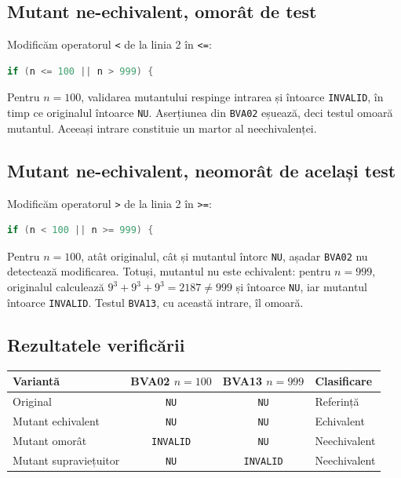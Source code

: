 \documentclass[11pt,a4paper]{article}
\begin{document}
\subsection{Mutant ne-echivalent, omorât de test}
Modificăm operatorul \texttt{<} de la linia 2 în \texttt{<=}:
\begin{lstlisting}[language=Java,firstnumber=2]
if (n <= 100 || n > 999) {
\end{lstlisting}
Pentru $n=100$, validarea mutantului respinge intrarea și întoarce
\texttt{INVALID}, în timp ce originalul întoarce \texttt{NU}.
Aserțiunea din \texttt{BVA02} eșuează, deci testul omoară mutantul.
Aceeași intrare constituie un martor al neechivalenței.

\subsection{Mutant ne-echivalent, neomorât de același test}
Modificăm operatorul \texttt{>} de la linia 2 în \texttt{>=}:
\begin{lstlisting}[language=Java,firstnumber=2]
if (n < 100 || n >= 999) {
\end{lstlisting}
Pentru $n=100$, atât originalul, cât și mutantul întorc \texttt{NU},
așadar \texttt{BVA02} nu detectează modificarea.
Totuși, mutantul nu este echivalent: pentru $n=999$, originalul calculează
$9^3+9^3+9^3=2187\ne999$ și întoarce \texttt{NU}, iar mutantul întoarce
\texttt{INVALID}. Testul \texttt{BVA13}, cu această intrare, îl omoară.

\subsection{Rezultatele verificării}
\begin{center}
\begin{tabular}{@{}lccl@{}}
\toprule
Variantă & \shortstack{BVA02\\[3pt]$n=100$} & \shortstack{BVA13\\[3pt]$n=999$} & Clasificare \\
\midrule
Original & \texttt{NU} & \texttt{NU} & Referință \\
Mutant echivalent & \texttt{NU} & \texttt{NU} & Echivalent \\
Mutant omorât & \texttt{INVALID} & \texttt{NU} & Neechivalent \\
Mutant supraviețuitor & \texttt{NU} & \texttt{INVALID} & Neechivalent \\
\bottomrule
\end{tabular}
\end{center}
\end{document}

